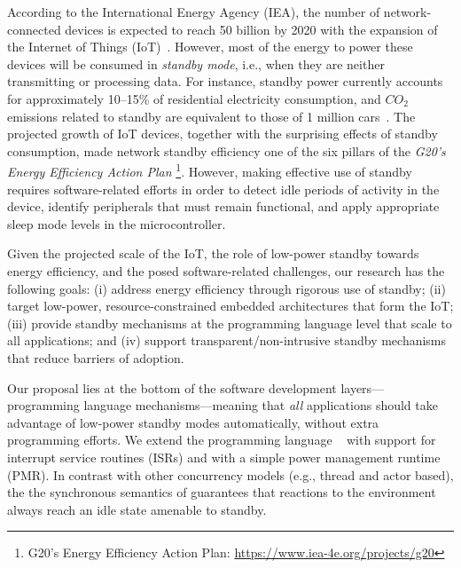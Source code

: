 \label{sec.introduction}

According to the International Energy Agency (IEA), the number of
network-connected devices is expected to reach 50 billion by 2020 with the
expansion of the Internet of Things (IoT)~\cite{iea.data}.
%
However, most of the energy to power these devices will be consumed in
\emph{standby mode}, i.e., when they are neither transmitting or processing
data.
%
For instance, standby power currently accounts for approximately 10--15\% of
residential electricity consumption, and $CO_2$ emissions related to standby
are equivalent to those of 1 million cars~\cite{iea.data,standby.australia}.
%
The projected growth of IoT devices, together with the surprising effects of
standby consumption, made network standby efficiency one of the six
pillars of the \emph{G20's Energy Efficiency Action Plan}%
\footnote{G20's Energy Efficiency Action Plan: \url{https://www.iea-4e.org/projects/g20}}.
%
However, making effective use of standby requires software-related efforts in
order to detect idle periods of activity in the device, identify peripherals
that must remain functional, and apply appropriate sleep mode levels in the
microcontroller.

Given the projected scale of the IoT, the role of low-power standby towards
energy efficiency, and the posed software-related challenges, our research has
the following goals:
%
(i)   address energy efficiency through rigorous use of standby;
(ii)  target low-power, resource-constrained embedded architectures that form
      the IoT;
(iii) provide standby mechanisms at the programming language level that scale
      to all applications; and
(iv)  support transparent/non-intrusive standby mechanisms that reduce barriers
      of adoption.

Our proposal lies at the bottom of the software development
layers---programming language mechanisms---meaning that \emph{all} applications
should take advantage of low-power standby modes automatically, without extra
programming efforts.
%
We extend the programming language \CEU~\cite{ceu.sensys13,ceu.tecs17} with
support for interrupt service routines (ISRs) and with a simple power
management runtime (PMR).
%
In contrast with other concurrency models (e.g., thread and actor based), the
the synchronous semantics of \CEU guarantees that reactions to the environment
always reach an idle state amenable to standby.

